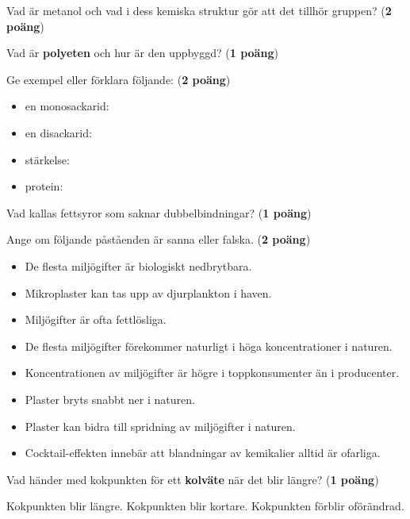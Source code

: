 \documentclass[12pt]{exam}
\begin{document}
\begin{questions}
\question Vad är metanol och vad i dess kemiska struktur gör att det tillhör gruppen? (\textbf{2 poäng})
\vspace{20mm}

\question Vad är \textbf{polyeten} och hur är den uppbyggd? (\textbf{1 poäng})
\vspace{20mm}

\question Ge exempel eller förklara följande: (\textbf{2 poäng})
\begin{itemize}
  \item en monosackarid:
  \vspace{5mm}
  \item en disackarid:
  \vspace{5mm}
  \item stärkelse:
  \vspace{5mm}
  \item protein:
\end{itemize}
\vspace{5mm}

\question Vad kallas fettsyror som saknar dubbelbindningar? (\textbf{1 poäng})

\break

\question Ange om följande påståenden är sanna eller falska. (\textbf{2 poäng})
\begin{itemize}
  \item De flesta miljögifter är biologiskt nedbrytbara.
  \item Mikroplaster kan tas upp av djurplankton i haven.
  \item Miljögifter är ofta fettlösliga.
  \item De flesta miljögifter förekommer naturligt i höga koncentrationer i naturen.
  \item Koncentrationen av miljögifter är högre i toppkonsumenter än i producenter.
  \item Plaster bryts snabbt ner i naturen.
  \item Plaster kan bidra till spridning av miljögifter i naturen.
  \item Cocktail-effekten innebär att blandningar av kemikalier alltid är ofarliga.
\end{itemize}
\vspace{10mm}

\question Vad händer med kokpunkten för ett \textbf{kolväte} när det blir längre? (\textbf{1 poäng})
\begin{checkboxes}
  \choice Kokpunkten blir längre.
  \choice Kokpunkten blir kortare.
  \choice Kokpunkten förblir oförändrad.
\end{checkboxes}
\vspace{5mm}  


\end{questions}
\end{document}
